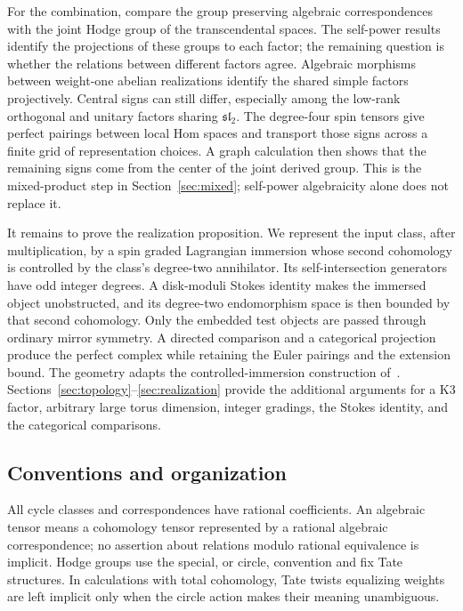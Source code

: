 \documentclass[11pt]{article}
\numberwithin{equation}{section}
\theoremstyle{definition}
\theoremstyle{remark}
\begin{document}
For the combination, compare the group preserving algebraic
correspondences with the joint Hodge group of the transcendental
spaces.  The self-power results identify the projections of these
groups to each factor; the remaining question is whether the
relations between different factors agree.  Algebraic morphisms
between weight-one abelian realizations
identify the shared simple factors projectively.  Central signs can
still differ, especially among the low-rank orthogonal and unitary
factors sharing \(\mathfrak{sl}_2\).  The degree-four spin tensors
give perfect pairings between local Hom spaces and transport those
signs across a finite grid of representation choices.  A graph
calculation then shows that the remaining signs come from the center
of the joint derived group.  This is the mixed-product step in
Section~\ref{sec:mixed}; self-power algebraicity alone does not
replace it.

It remains to prove the realization proposition.  We represent the
input class, after multiplication, by a spin graded Lagrangian
immersion whose second cohomology is controlled by the class's
degree-two annihilator.  Its self-intersection generators have odd
integer degrees.  A disk-moduli Stokes identity makes the immersed
object unobstructed, and its degree-two endomorphism space is then
bounded by that second cohomology.  Only the embedded test objects
are passed through ordinary mirror symmetry.  A directed comparison
and a categorical projection produce the perfect complex while
retaining the Euler pairings and the extension bound.
The geometry adapts the controlled-immersion construction
of~\cite{A8}.  Sections~\ref{sec:topology}--\ref{sec:realization}
provide the additional arguments for a K3 factor, arbitrary large
torus dimension, integer gradings, the Stokes identity, and the
categorical comparisons.

\subsection{Conventions and organization}

All cycle classes and correspondences have rational coefficients.
An algebraic tensor means a cohomology tensor represented by a rational
algebraic correspondence; no assertion about relations modulo rational
equivalence is implicit.  Hodge groups use the special, or circle,
convention and fix Tate structures.  In calculations with total
cohomology, Tate twists equalizing weights are left implicit only
when the circle action makes their meaning unambiguous.
\end{document}
